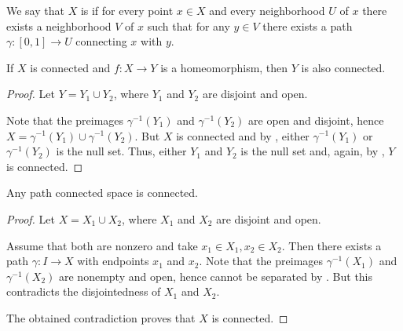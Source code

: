 \medskip

\begin{definition}\label{def:locally_path_connected_space}
  We say that \( X \) is  if for every point \( x \in X \) and every neighborhood \( U \) of \( x \) there exists a neighborhood \( V \) of \( x \) such that for any \( y \in V \) there exists a path \( \gamma: [0, 1] \to U \) connecting \( x \) with \( y \).
\end{definition}

\begin{proposition}\label{thm:homomorphism_preserves_connectedness}
  If \( X \) is connected and \( f: X \to Y \) is a homeomorphism, then \( Y \) is also connected.
\end{proposition}
\begin{proof}
  Let \( Y = Y_1 \cup Y_2 \), where \( Y_1 \) and \( Y_2 \) are disjoint and open.

  Note that the preimages \( \gamma^{-1}(Y_1) \) and \( \gamma^{-1}(Y_2) \) are open and disjoint, hence \( X = \gamma^{-1}(Y_1) \cup \gamma^{-1}(Y_2) \). But \( X \) is connected and by , either \( \gamma^{-1}(Y_1) \) or \( \gamma^{-1}(Y_2) \) is the null set. Thus, either \( Y_1 \) and \( Y_2 \) is the null set and, again, by , \( Y \) is connected.
\end{proof}

\begin{proposition}\label{thm:path_connected_implies_connected}
  Any path connected space is connected.
\end{proposition}
\begin{proof}
  Let \( X = X_1 \cup X_2 \), where \( X_1 \) and \( X_2 \) are disjoint and open.

  Assume that both are nonzero and take \( x_1 \in X_1, x_2 \in X_2 \). Then there exists a path \( \gamma: I \to X \) with endpoints \( x_1 \) and \( x_2 \). Note that the preimages \( \gamma^{-1}(X_1) \) and \( \gamma^{-1}(X_2) \) are nonempty and open, hence cannot be separated by . But this contradicts the disjointedness of \( X_1 \) and \( X_2 \).

  The obtained contradiction proves that \( X \) is connected.
\end{proof}
